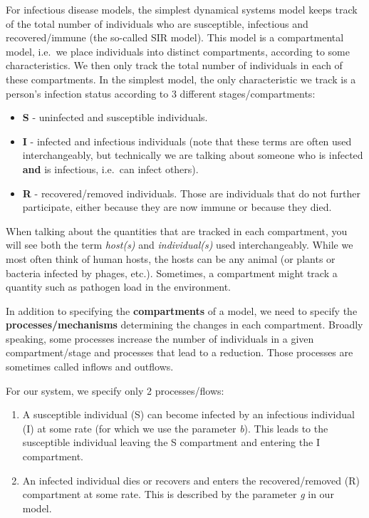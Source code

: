 \documentclass[]{book}
\providecommand{\tightlist}{%
  \setlength{\itemsep}{0pt}\setlength{\parskip}{0pt}}
\theoremstyle{definition}
\theoremstyle{definition}
\theoremstyle{definition}
\theoremstyle{remark}
\begin{document}
For infectious disease models, the simplest dynamical systems model
keeps track of the total number of individuals who are susceptible,
infectious and recovered/immune (the so-called SIR model). This model is
a compartmental model, i.e.~we place individuals into distinct
compartments, according to some characteristics. We then only track the
total number of individuals in each of these compartments. In the
simplest model, the only characteristic we track is a person's infection
status according to 3 different stages/compartments:

\begin{itemize}
\tightlist
\item
  \textbf{S} - uninfected and susceptible individuals.
\item
  \textbf{I} - infected and infectious individuals (note that these
  terms are often used interchangeably, but technically we are talking
  about someone who is infected \textbf{and} is infectious, i.e.~can
  infect others).
\item
  \textbf{R} - recovered/removed individuals. Those are individuals that
  do not further participate, either because they are now immune or
  because they died.
\end{itemize}

When talking about the quantities that are tracked in each compartment,
you will see both the term \emph{host(s)} and \emph{individual(s)} used
interchangeably. While we most often think of human hosts, the hosts can
be any animal (or plants or bacteria infected by phages, etc.).
Sometimes, a compartment might track a quantity such as pathogen load in
the environment.

In addition to specifying the \textbf{compartments} of a model, we need
to specify the \textbf{processes/mechanisms} determining the changes in
each compartment. Broadly speaking, some processes increase the number
of individuals in a given compartment/stage and processes that lead to a
reduction. Those processes are sometimes called inflows and outflows.

For our system, we specify only 2 processes/flows:

\begin{enumerate}
\def\labelenumi{\arabic{enumi}.}
\tightlist
\item
  A susceptible individual (S) can become infected by an infectious
  individual (I) at some rate (for which we use the parameter \emph{b}).
  This leads to the susceptible individual leaving the S compartment and
  entering the I compartment.\\
\item
  An infected individual dies or recovers and enters the
  recovered/removed (R) compartment at some rate. This is described by
  the parameter \emph{g} in our model.
\end{enumerate}
\end{document}
